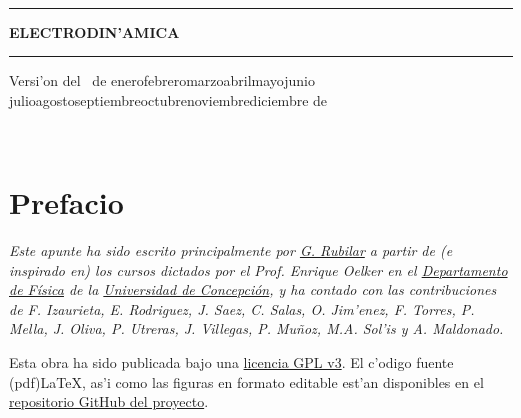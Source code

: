 \documentclass[letterpaper,11pt]{report}
\def\today{\number\day~de\space\ifcase\month\or
 enero\or febrero\or marzo\or abril\or mayo\or junio\or
 julio\or agosto\or septiembre\or octubre\or noviembre\or diciembre\fi
 \space de~\number\year}
\begin{document}
\thispagestyle{empty}
\begin{center}

\

\vspace{6.5cm}

\rule{15cm}{0.1cm}

\vspace{1.5cm}

{\huge \textsc{\textbf{ELECTRODIN'AMICA}}}

\vspace{1.5cm}

\rule{15cm}{0.1cm}

\vspace{1.5cm}

Versi'on del \today

\end{center}

\newpage
\thispagestyle{empty}
\ \\
\newpage
\setcounter{page}{1}

\pagestyle{plain}
\chapter*{Prefacio}
\bigskip
\bigskip
\bigskip
\bigskip
\bigskip
\bigskip


\emph{Este apunte ha sido escrito principalmente por \href{https://google.com/+GuillermoRubilar}{G. Rubilar} a partir de (e inspirado en) los cursos dictados por el Prof. Enrique Oelker en el \href{http://www.fisica.udec.cl/}{Departamento de F\'isica} de la \href{www.udec.cl}{Universidad de Concepci\'on}, y ha contado con las contribuciones de F. Izaurieta, E. Rodriguez, J. Saez, C. Salas, O. Jim'enez, F. Torres, P. Mella, J. Oliva, P. Utreras, J. Villegas, P. Mu\~noz, M.A. Sol'is y A. Maldonado.}

\bigskip


\bigskip

Esta obra ha sido publicada bajo una \href{https://github.com/gfrubi/electrodinamica/blob/master/LICENSE}{licencia GPL v3}. El c'odigo fuente (pdf)\LaTeX, as'i como las figuras en formato editable est'an disponibles en el \href{https://github.com/gfrubi/electrodinamica}{repositorio GitHub del proyecto}.
\bigskip
\bigskip
\bigskip


\bigskip
\bigskip
\bigskip
\end{document}
